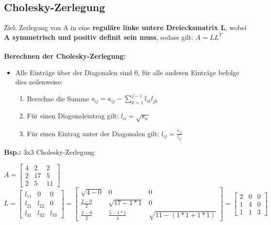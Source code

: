 \documentclass[10pt,a4paper]{article}
\begin{document}
	\subsection{Cholesky-Zerlegung}
	Ziel: Zerlegung von A in eine \textbf{reguläre linke untere Dreiecksmatrix L}, wobei \textbf{A symmetrisch und positiv definit sein muss}, sodass gilt: $A = LL^T$\\\\
	\textbf{Berechnen der Cholesky-Zerlegung:}
	\begin{itemize}
		\item Alle Einträge über der Diagonalen sind 0, für alle anderen Einträge befolge dies zeilenweise:
		\begin{enumerate}
			\item Berechne die Summe $s_{ij} = a_{ij} - \sum_{k = 1}^{j - 1} l_{ik}l_{jk}$
			\item Für einen Diagonaleintrag gilt: $l_{ii} = \sqrt{s_{ii}}$ 
			\item Für einen Eintrag unter der Diagonalen gilt: $l_{ij} = \frac{s_{ij}}{l_{jj}}$
		\end{enumerate}
	\end{itemize}
	\textbf{Bsp.:} 3x3 Cholesky-Zerlegung
	\begin{center}
		$A = \begin{bmatrix}4 & 2 & 2\\2 & 17 & 5\\2 & 5 & 11\end{bmatrix}$\\\vspace*{0.5cm}
		$L = \begin{bmatrix}l_{11} & 0 & 0\\l_{21} & l_{22} & 0\\l_{31} & l_{32} & l_{33}\end{bmatrix}
		= \begin{bmatrix}
		  \sqrt{4 - 0} & 0 & 0\\
		  \frac{2 - 0}{2} & \sqrt{17 - 1 * 1} & 0\\
		  \frac{2 - 0}{2} & \frac{5 - 1 * 1}{4} & \sqrt{11 - (1 * 1 + 1 * 1)}
 		\end{bmatrix}
 		= \begin{bmatrix}
 			2 & 0 & 0\\
 			1 & 4 & 0\\
 			1 & 1 & 3
 		\end{bmatrix}$
	\end{center}
		
\end{document}
